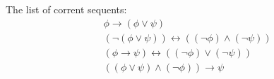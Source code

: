 \documentclass{article}
\begin{document}
The list of corrent sequents:
\begin{align*}
&\phi\rightarrow(\phi\lor\psi)\\
&(\lnot(\phi\lor\psi))\leftrightarrow((\lnot\phi)\land(\lnot\psi))\\
&(\phi\rightarrow\psi)\leftrightarrow((\lnot\phi)\lor(\lnot\psi))\\
&((\phi\lor\psi)\land(\lnot\phi))\rightarrow\psi
\end{align*}
\end{document}
